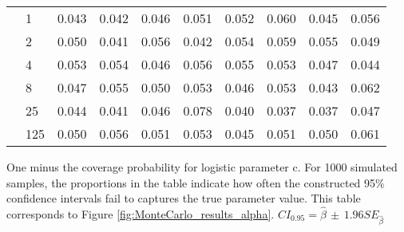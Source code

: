 \documentclass[12pt]{article}
\theoremstyle{definition}
\begin{document}
\begin{table}[b!]
\begin{threeparttable}
{\begin{tabular}[r]{l l r r r r r r r r}
          &    1 & 0.043 & 0.042 & 0.046 & 0.051 & 0.052 & 0.060 & 0.045 & 0.056 \\
          &    2 & 0.050 & 0.041 & 0.056 & 0.042 & 0.054 & 0.059 & 0.055 & 0.049 \\
          &    4 & 0.053 & 0.054 & 0.046 & 0.056 & 0.055 & 0.053 & 0.047 & 0.044 \\
          &    8 & 0.047 & 0.055 & 0.050 & 0.053 & 0.046 & 0.053 & 0.043 & 0.062 \\
          &   25 & 0.044 & 0.041 & 0.046 & 0.078 & 0.040 & 0.037 & 0.037 & 0.047 \\
          &  125 & 0.050 & 0.056 & 0.051 & 0.053 & 0.045 & 0.051 & 0.050 & 0.061 \\
  \hline
    \end{tabular}
    }
    \begin{tablenotes}
      \item{\footnotesize One minus the coverage probability for logistic parameter c. For 1000 simulated samples, the proportions in the table indicate how often the constructed 95\% confidence intervals fail to captures the true parameter value. This table corresponds to Figure \ref{fig:MonteCarlo_results_alpha}. $CI_{0.95} = \hat\beta \, \pm \, 1.96 SE_{\hat{\beta}}$}
    \end{tablenotes} \label{tbl:coverage_ratio_alpha}
  \end{threeparttable}
\end{table}
\end{document}
